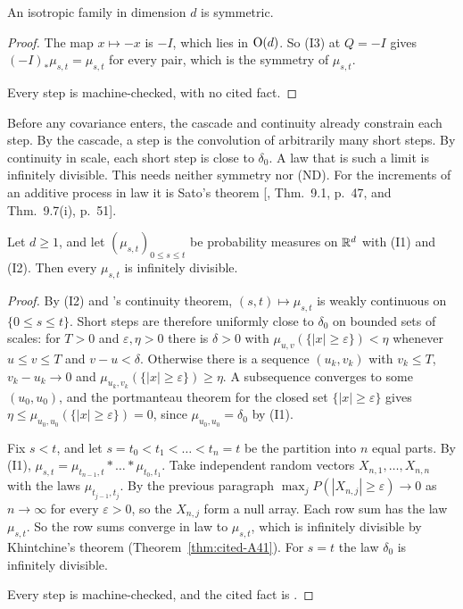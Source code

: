 \begin{lemma}
\label{lem:isotropic-symmetric}

An isotropic family in dimension $d$ is symmetric.
\end{lemma}

\begin{proof}
The map $x \mapsto -x$ is $-I$, which lies in $\mathrm{O}(d)$. So (I3) at $Q = -I$ gives
$(-I)_*\mu_{s,t} = \mu_{s,t}$ for every pair, which is the symmetry of $\mu_{s,t}$.

Every step is machine-checked, with no cited fact.
\end{proof}

Before any covariance enters, the cascade and continuity already constrain each step. By the
cascade, a step is the convolution of arbitrarily many short steps. By continuity in scale, each
short step is close to $\delta_0$. A law that is such a limit is infinitely divisible. This needs
neither symmetry nor (ND). For the increments of an additive process in law it is Sato's theorem
[, Thm.~9.1, p.~47, and Thm.~9.7(i), p.~51].

\begin{lemma}
\label{lem:steps-infinitely-divisible}

Let $d \ge 1$, and let $(\mu_{s,t})_{0 \le s \le t}$ be probability measures on $\mathbb{R}^d$ with (I1)
and (I2). Then every $\mu_{s,t}$ is infinitely divisible.
\end{lemma}

\begin{proof}
By (I2) and \Levy's continuity theorem, $(s,t) \mapsto \mu_{s,t}$ is weakly continuous on
$\{0 \le s \le t\}$. Short steps are therefore uniformly close to $\delta_0$ on bounded sets of
scales: for $T > 0$ and $\varepsilon, \eta > 0$ there is $\delta > 0$ with
$\mu_{u,v}(\{|x| \ge \varepsilon\}) < \eta$ whenever $u \le v \le T$ and $v - u < \delta$. Otherwise
there is a sequence $(u_k, v_k)$ with $v_k \le T$, $v_k - u_k \to 0$ and
$\mu_{u_k,v_k}(\{|x| \ge \varepsilon\}) \ge \eta$. A subsequence converges to some $(u_0, u_0)$, and
the portmanteau theorem for the closed set $\{|x| \ge \varepsilon\}$ gives
$\eta \le \mu_{u_0,u_0}(\{|x| \ge \varepsilon\}) = 0$, since $\mu_{u_0,u_0} = \delta_0$ by (I1).

Fix $s < t$, and let $s = t_0 < t_1 < \dots < t_n = t$ be the partition into $n$ equal parts. By
(I1), $\mu_{s,t} = \mu_{t_{n-1},t} * \dots * \mu_{t_0,t_1}$. Take independent random vectors
$X_{n,1}, \dots, X_{n,n}$ with the laws $\mu_{t_{j-1},t_j}$. By the previous paragraph
$\max_jP(|X_{n,j}| \ge \varepsilon) \to 0$ as $n \to \infty$ for every $\varepsilon > 0$, so the
$X_{n,j}$ form a null array. Each row sum has the law $\mu_{s,t}$. So the row sums converge in law to
$\mu_{s,t}$, which is infinitely divisible by Khintchine's theorem
(Theorem~\ref{thm:cited-A41}). For $s = t$ the law $\delta_0$ is infinitely divisible.

Every step is machine-checked, and the cited fact is .
\end{proof}

